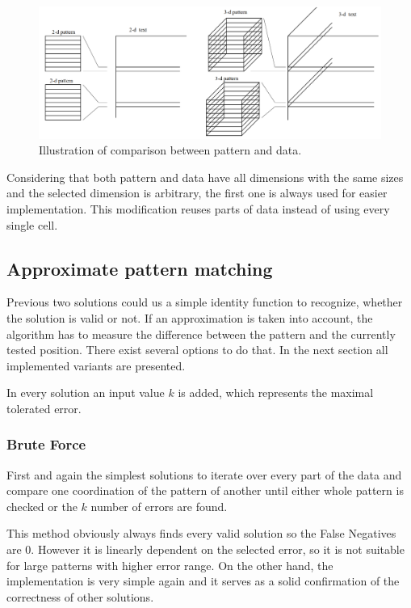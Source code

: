\begin{figure}
\centering
\includegraphics[width=\textwidth]{skipDim}
\caption{Illustration of comparison between pattern and data. \cite{mdApproxPM}}
\label{fig_skipDim}
\end{figure}

Considering that both pattern and data have all dimensions with the same sizes and the selected dimension is arbitrary, the first one is always used for easier implementation. This modification reuses parts of data instead of using every single cell.

\subsection{Approximate pattern matching} \label{apm}
Previous two solutions could us a simple identity function to recognize, whether the solution is valid or not. If an approximation is taken into account, the algorithm has to measure the difference between the pattern and the currently tested position. There exist several options to do that. In the next section all implemented variants are presented.

In every solution an input value $k$ is added, which represents the maximal tolerated error.

\subsubsection{Brute Force}
First and again the simplest solutions to iterate over every part of the data and compare one coordination of the pattern of another until either whole pattern is checked or the $k$ number of errors are found.

This method obviously always finds every valid solution so the False Negatives are 0. However it is linearly dependent on the selected error, so it is not suitable for large patterns with higher error range. On the other hand, the implementation is very simple again and it serves as a solid confirmation of the correctness of other solutions.

